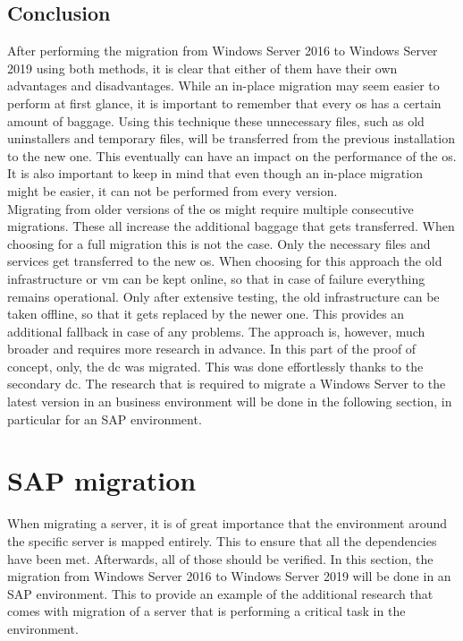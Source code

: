 \subsection{Conclusion}
After performing the migration from Windows Server 2016 to Windows Server 2019 using both methods, it is clear that either of them have their own advantages and disadvantages. While an in-place migration may seem easier to perform at first glance, it is important to remember that every \acrshort{os} has a certain amount of baggage. Using this technique these unnecessary files, such as old uninstallers and temporary files, will be transferred from the previous installation to the new one. This eventually can have an impact on the performance of the \acrshort{os}. It is also important to keep in mind that even though an in-place migration might be easier, it can not be performed from every version.
\\
Migrating from older versions of the \acrshort{os} might require multiple consecutive migrations. These all increase the additional baggage that gets transferred. When choosing for a full migration this is not the case. Only the necessary files and services get transferred to the new \acrshort{os}. When choosing for this approach the old infrastructure or \acrshort{vm} can be kept online, so that in case of failure everything remains operational. Only after extensive testing, the old infrastructure can be taken offline, so that it gets replaced by the newer one. This provides an additional fallback in case of any problems. The approach is, however, much broader and requires more research in advance. In this part of the proof of concept, only, the \acrshort{dc} was migrated. This was done effortlessly thanks to the secondary \acrshort{dc}. The research that is required to migrate a Windows Server to the latest version in an business environment will be done in the following section, in particular for an SAP environment. 
\clearpage

\section{SAP migration}
When migrating a server, it is of great importance that the environment around the specific server is mapped entirely. This to ensure that all the dependencies have been met. Afterwards, all of those should be verified. In this section, the migration from Windows Server 2016 to Windows Server 2019 will be done in an SAP environment. This to provide an example of the additional research that comes with migration of a server that is performing a critical task in the environment. 

